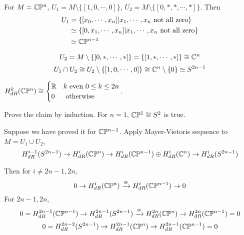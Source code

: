 \begin{example}
    For  $ M=\mathbb C\mathbb P^n  $,  $ U_1=M\setminus\{[1,0,\cdots,0]\} $,  $ U_2=M\setminus\{[0,*,*,\cdots,*]\} $. Then 
    \begin{equation*}
        \begin{aligned}
            U_1&=\{[x_0,\cdots,x_n]|x_1,\cdots,x_n \text{ not all zero}\}\\&\simeq\{[0,x_1,\cdots,x_n]|x_1,\cdots,x_n \text{ not all zero}\}\\&\simeq \mathbb C\mathbb P^{n-1}
        \end{aligned}
    \end{equation*}

    \begin{equation*}
        U_2=M\setminus\{[0,*,\cdots,*]\}=\{[1,*,\cdots,*]\}\cong \mathbb C^n
    \end{equation*}
    \begin{equation*}
        U_1\cap U_2\cong U_2\setminus\{[1,0,\cdots,0]\}\cong \mathbb C^n\setminus\{0\}\simeq S^{2n-1}
    \end{equation*}

    \begin{claim}
        $ H^k_{dR}(\mathbb C\mathbb P^n)\cong \begin{cases}
            \mathbb R&k \text{ even }0 \leq k \leq 2n\\
            0&\text{ otherwise}
        \end{cases}$.
    \end{claim}
    Prove the claim by induction. For  $ n=1 $,  $ \mathbb C\mathbb P^1\cong S^2 $ is true.
    
    Suppose we have proved it for  $ \mathbb C\mathbb P^{n-1} $. Apply Mayer-Vietoris sequence to  $ M=U_1\cup U_2 $, 
    \begin{equation}
        H_{dR}^{i-1}(S^{2n-1})\rightarrow H_{dR}^{i}(\mathbb C\mathbb P^n)\rightarrow H_{dR}^i(\mathbb C\mathbb P^{n-1})\oplus H_{dR}^i(\mathbb C^n)\rightarrow H_{dR}^i(S^{2n-1})
    \end{equation}

    Then for  $ i\neq 2n-1,2n $,
    \begin{equation}
        0\rightarrow H^i_{dR}(\mathbb C\mathbb P^n)\xrightarrow{\cong}H^i_{dR}(\mathbb C\mathbb P^{n-1})\rightarrow 0
    \end{equation} 
    For  $ 2n-1,2n $,
    \begin{equation}
        0=H^{2n-1}_{dR}(\mathbb C\mathbb P^{n-1})\rightarrow H_{dR}^{2n-1}(S^{2n-1})\xrightarrow{ \cong} H_{dR}^{2n}(\mathbb C\mathbb P^n)\rightarrow H_{dR}^{2n}(\mathbb C\mathbb P^{n-1})=0
    \end{equation} 
    \begin{equation*}
        0=H_{dR}^{2n-2}(S^{2n-1})\rightarrow H_{dR}^{2n-1}(\mathbb C\mathbb P^n)\rightarrow H_{dR}^{2n-1}(\mathbb C\mathbb P^{n-1})=0
    \end{equation*}
\end{example}
